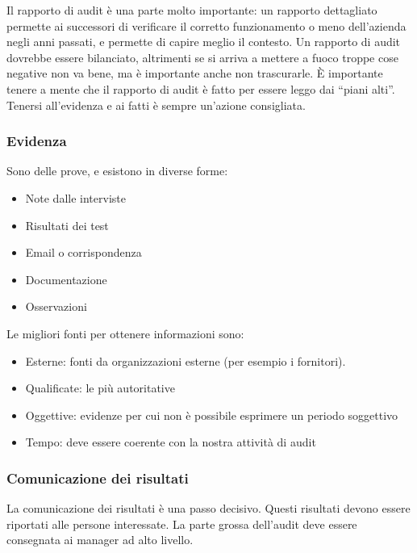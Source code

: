 Il rapporto di audit è una parte molto importante: un rapporto dettagliato permette ai successori di verificare il corretto funzionamento o meno dell'azienda negli anni passati, e permette di capire meglio il contesto. Un rapporto di audit dovrebbe essere bilanciato, altrimenti se si arriva a mettere a fuoco troppe cose negative non va bene, ma è importante anche non trascurarle. È importante tenere a mente che il rapporto di audit è fatto per essere leggo dai ``piani alti''. Tenersi all'evidenza e ai fatti è sempre un'azione consigliata.






\subsubsection{Evidenza}

Sono delle prove, e esistono in diverse forme:
\begin{itemize}
\item Note dalle interviste
\item Risultati dei test
\item Email o corrispondenza
\item Documentazione
\item Osservazioni
\end{itemize}

Le migliori fonti per ottenere informazioni sono:
\begin{itemize}
\item Esterne: fonti da organizzazioni esterne (per esempio i fornitori).
\item Qualificate: le più autoritative
\item Oggettive: evidenze per cui non è possibile esprimere un periodo soggettivo
\item Tempo: deve essere coerente con la nostra attività di audit 
\end{itemize}



\subsubsection{Comunicazione dei risultati}

La comunicazione dei risultati è una passo decisivo. Questi risultati devono essere riportati alle persone interessate.
La parte grossa dell'audit deve essere consegnata ai manager ad alto livello.


